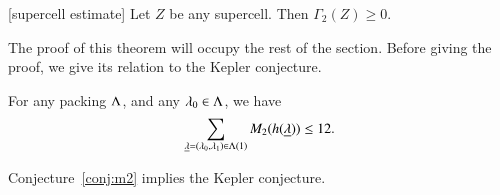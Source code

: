\begin{theorem}[supercell estimate]\label{lemma:superineq} 
Let $Z$ be any supercell.  Then $\Gamma_2(Z)\ge 0$.
\end{theorem}

The proof of this theorem will occupy the rest of the section.  Before giving the proof, we give its relation to the Kepler conjecture.


\begin{conjecture}\label{conj:m2} For any packing $\Lambda$, and
any $\lambda_0\in\Lambda$, we have
\begin{equation}\label{eqn:M12}
\sum_{{\underline{\lambda}}=(\lambda_0,\lambda_1)\in\Lambda(1)} M_2(h({\underline{\lambda}})) \le 12.
\end{equation}
\end{conjecture}

\begin{theorem}\label{theorem:mk2}
Conjecture~\ref{conj:m2} implies the Kepler conjecture.
\end{theorem}

